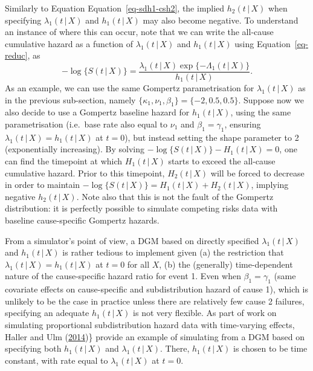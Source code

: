 \documentclass[
  letterpaper,
  DIV=11,
  numbers=noendperiod]{scrreprt}
\newcommand{\given}{\,|\,}
\begin{document}
Similarly to Equation Equation~\ref{eq-sdh1-csh2}, the implied
\(h_2(t \given X)\) when specifying \(\lambda_1(t \given X)\) and
\(h_1(t \given X)\) may also become negative. To understand an instance
of where this can occur, note that we can write the all-cause cumulative
hazard as a function of \(\lambda_1(t \given X)\) and
\(h_1(t \given X)\) using Equation~\ref{eq-reduc}, as \begin{equation*}
    -\log\{S(t \given X)\} = \frac{\lambda_1(t \given X) \exp\{-\Lambda_1(t \given X)\}}{h_1(t \given X)}.
\end{equation*} As an example, we can use the same Gompertz
parametrisation for \(\lambda_1(t \given X)\) as in the previous
sub-section, namely \(\{\kappa_1, \nu_1, \beta_1\} = \{-2, 0.5, 0.5\}\).
Suppose now we also decide to use a Gompertz baseline hazard for
\(h_1(t \given X)\), using the same parametrisation (i.e.~base rate also
equal to \(\nu_1\) and \(\beta_1 = \gamma_1\), ensuring
\(\lambda_1(t \given X) = h_1(t \given X)\) at \(t = 0\)), but instead
setting the shape parameter to 2 (exponentially increasing). By solving
\(-\log\{S(t \given X)\} - H_1(t \given X) = 0\), one can find the
timepoint at which \(H_1(t \given X)\) starts to exceed the all-cause
cumulative hazard. Prior to this timepoint, \(H_2(t \given X)\) will be
forced to decrease in order to maintain
\(-\log\{S(t \given X)\} = H_1(t \given X) + H_2(t \given X)\), implying
negative \(h_2(t \given X)\). Note also that this is not the fault of
the Gompertz distribution: it is perfectly possible to simulate
competing risks data with baseline cause-specific Gompertz hazards.

From a simulator's point of view, a DGM based on directly specified
\(\lambda_1(t \given X)\) and \(h_1(t \given X)\) is rather tedious to
implement given (a) the restriction that
\(\lambda_1(t \given X) = h_1(t \given X)\) at \(t = 0\) for all \(X\),
(b) the (generally) time-dependent nature of the cause-specific hazard
ratio for event 1. Even when \(\beta_1 = \gamma_1\) (same covariate
effects on cause-specific and subdistribution hazard of cause 1), which
is unlikely to be the case in practice unless there are relatively few
cause 2 failures, specifying an adequate \(h_1(t \given X)\) is not very
flexible. As part of work on simulating proportional subdistribution
hazard data with time-varying effects, Haller and Ulm
(\protect\hyperlink{ref-hallerFlexibleSimulationCompeting2014}{2014})\}
provide an example of simulating from a DGM based on specifying both
\(h_1(t \given X)\) and \(\lambda_1(t \given X)\). There,
\(h_1(t \given X)\) is chosen to be time constant, with rate equal to
\(\lambda_1(t \given X)\) at \(t = 0\).
\end{document}
